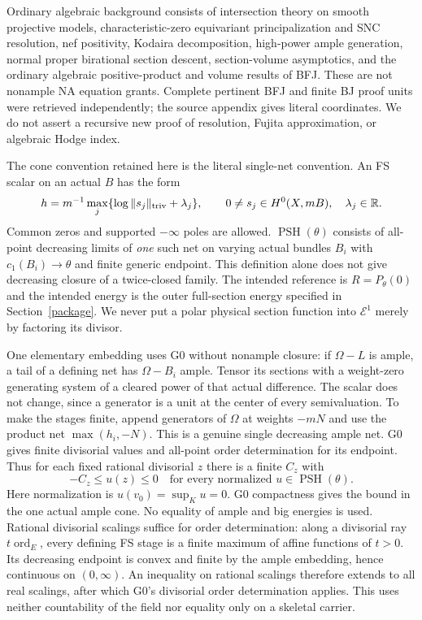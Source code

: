 \documentclass[10pt]{article}
\newcommand{\PSH}{\operatorname{PSH}}
\newcommand{\E}{\mathcal E}
\begin{document}
Ordinary algebraic background consists of intersection theory on smooth
projective models, characteristic-zero equivariant principalization and SNC
resolution, nef positivity, Kodaira decomposition, high-power ample generation,
normal proper birational section descent, section-volume asymptotics, and the
ordinary algebraic positive-product and volume results of BFJ. These are not
nonample NA equation grants. Complete pertinent BFJ and finite BJ proof units
were retrieved independently; the source appendix gives literal coordinates.
We do not assert a recursive new proof of resolution, Fujita approximation,
or algebraic Hodge index.

The cone convention retained here is the literal single-net convention.
An FS scalar on an actual $B$ has the form
\[
 h=m^{-1}\max_j\{\log\|s_j\|_{\rm triv}+\lambda_j\},\qquad
 0\ne s_j\in H^0(X,mB),\quad\lambda_j\in\mathbb R.
\]
Common zeros and supported $-\infty$ poles are allowed. $\PSH(\theta)$
consists of all-point decreasing limits of \emph{one} such net on varying
actual bundles $B_i$ with $c_1(B_i)\to\theta$ and finite generic endpoint.
This definition alone does not give decreasing closure of a twice-closed
family. The intended reference is $R=P_\theta(0)$ and the intended energy is
the outer full-section energy specified in Section~\ref{package}. We never put
a polar physical section function into $\E^1$ merely by factoring its divisor.

One elementary embedding uses G0 without nonample closure: if $\Omega-L$ is
ample, a tail of a defining net has $\Omega-B_i$ ample. Tensor its sections
with a weight-zero generating system of a cleared power of that actual
difference. The scalar does not change, since a generator is a unit at the
center of every semivaluation. To make the stages finite, append generators
of $\Omega$ at weights $-mN$ and use the product net $\max(h_i,-N)$.
This is a genuine single decreasing ample net. G0 gives finite divisorial
values and all-point order determination for its endpoint. Thus for each
fixed rational divisorial $z$ there is a finite $C_z$ with
\begin{equation}\label{coordinate-bound}
 -C_z\leq u(z)\leq0
 \quad\text{for every normalized }u\in\PSH(\theta).
\end{equation}
Here normalization is $u(v_0)=\sup_Ku=0$. G0 compactness gives the bound
in the one actual ample cone. No equality of ample and big energies is used.
Rational divisorial scalings suffice for order determination: along a
divisorial ray $t\operatorname{ord}_E$, every defining FS stage is a finite
maximum of affine functions of $t>0$. Its decreasing endpoint is convex
and finite by the ample embedding, hence continuous on $(0,\infty)$.
An inequality on rational scalings therefore extends to all real scalings,
after which G0's divisorial order determination applies. This uses neither
countability of the field nor equality only on a skeletal carrier.
\end{document}
